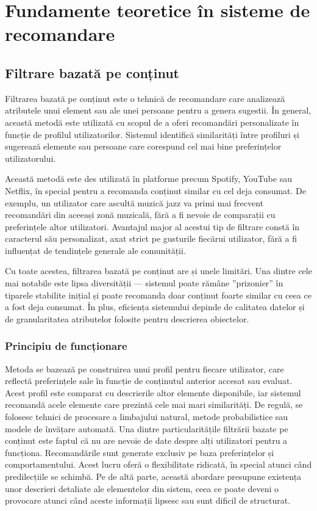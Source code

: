 \chapter{Fundamente teoretice în sisteme de recomandare}
\label{chap:ch3}

\section{Filtrare bazată pe conținut}
\label{sec:ch3sec1}

Filtrarea bazată pe conținut este o tehnică de recomandare care analizează atributele unui element sau ale unei persoane pentru a genera sugestii.
În general, această metodă este utilizată cu scopul de a oferi recomandări personalizate în funcție de profilul utilizatorilor.
Sistemul identifică similarități între profiluri și sugerează elemente sau persoane care corespund cel mai bine preferințelor utilizatorului\cite{kumar2018recommendation}.
\par
Această metodă este des utilizată în platforme precum Spotify, YouTube sau Netflix, în special pentru a recomanda conținut similar cu cel deja consumat. 
De exemplu, un utilizator care ascultă muzică jazz va primi mai frecvent recomandări din aceeași zonă muzicală, fără a fi nevoie de comparații cu preferințele altor utilizatori. 
Avantajul major al acestui tip de filtrare constă în caracterul său personalizat, axat strict pe gusturile fiecărui utilizator, fără a fi influențat de tendințele generale ale comunității.
\par
Cu toate acestea, filtrarea bazată pe conținut are și unele limitări. 
Una dintre cele mai notabile este lipsa diversității — sistemul poate rămâne ”prizonier” în tiparele stabilite inițial și poate recomanda doar conținut foarte similar cu ceea ce a fost deja consumat. 
În plus, eficiența sistemului depinde de calitatea datelor și de granularitatea atributelor folosite pentru descrierea obiectelor.

\subsection{Principiu de funcționare}
Metoda se bazează pe construirea unui profil pentru fiecare utilizator, care reflectă preferințele sale în funcție de conținutul anterior accesat sau evaluat. 
Acest profil este comparat cu descrierile altor elemente disponibile, iar sistemul recomandă acele elemente care prezintă cele mai mari similarități.
De regulă, se folosesc tehnici de procesare a limbajului natural, metode probabilistice sau modele de învățare automată.
Una dintre particularitățile filtrării bazate pe conținut este faptul că nu are nevoie de date despre alți utilizatori pentru a funcționa. Recomandările sunt generate exclusiv pe baza preferințelor și comportamentului.
Acest lucru oferă o flexibilitate ridicată, în special atunci când predilecțiile se schimbă. Pe de altă parte, această abordare presupune existența unor descrieri detaliate ale elementelor din sistem, ceea ce poate deveni o provocare atunci când aceste informații lipsesc sau sunt dificil de structurat\cite{ISINKAYE2015261}.
